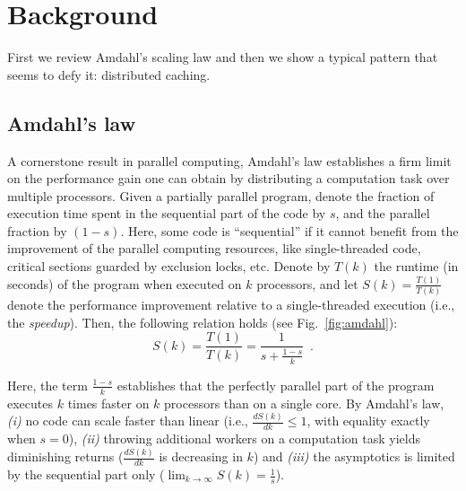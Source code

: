 \section{Background}\label{sec:background}

First we review Amdahl's scaling law and then we show a typical pattern that seems to defy it: distributed caching.

\subsection{Amdahl's law}
\label{sec:amdahl-law}

A cornerstone result in parallel computing, Amdahl's law \cite{10.1145/1465482.1465560} establishes a firm limit on the performance gain one can obtain by distributing a computation task over multiple processors. Given a partially parallel program, denote the fraction of execution time spent %
in the sequential part of the code by $s$, and the parallel fraction by $(1-s)$. Here, some code is ``sequential'' if it cannot benefit from the improvement of the parallel computing resources, like single-threaded code, critical sections guarded by exclusion locks, etc. Denote by $T(k)$ the runtime (in seconds) of the program when executed on $k$ processors, and let $S(k)=\frac{T(1)}{T(k)}$ denote the performance improvement relative to a single-threaded execution (i.e., the \emph{speedup}). Then, the following relation holds (see Fig.~\ref{fig:amdahl}):
\begin{equation}\label{eq:amdahl}
S(k) = \frac{T(1)}{T(k)} = \frac{1}{s + \frac{1-s}{k}} \enspace .
\end{equation}

Here, the term $\frac{1-s}{k}$ establishes that the perfectly parallel part of the program executes $k$ times faster on $k$ processors than on a single core. By Amdahl's law, \emph{(i)} no code can scale faster than linear (i.e., $\frac{d S(k)}{d k} \le 1$, with equality exactly when $s=0$), \emph{(ii)} throwing additional workers on a computation task yields diminishing returns ($\frac{d S(k)}{d k}$ is decreasing in $k$) and \emph{(iii)} the asymptotics is limited by the sequential part only ($\lim_{k\to \infty}S(k) = \frac1{s}$). 


